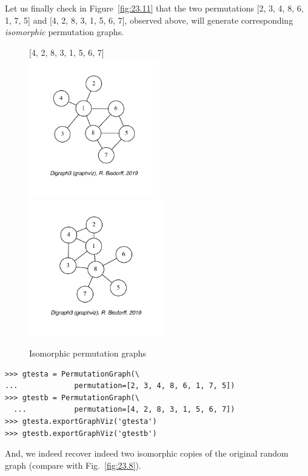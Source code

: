 Let us finally check in Figure~\vref{fig:23.11} that the two permutations [2, 3, 4, 8, 6, 1, 7, 5] and [4, 2, 8, 3, 1, 5, 6, 7], observed above, will generate corresponding \emph{isomorphic} permutation graphs.
\begin{figure}[ht]
  [2, 3, 4, 8, 6, 1, 7, 5]\hfill [4, 2, 8, 3, 1, 5, 6, 7]\\
  \includegraphics[height=6cm]{Figures/23-11-gtesta.pdf}\hfill
  \includegraphics[height=6cm]{Figures/23-11-gtestb.pdf}
\caption{Isomorphic permutation graphs} 
\label{fig:23.11}       %
\end{figure}
\begin{lstlisting}  
>>> gtesta = PermutationGraph(\
...             permutation=[2, 3, 4, 8, 6, 1, 7, 5])
>>> gtestb = PermutationGraph(\
  ...           permutation=[4, 2, 8, 3, 1, 5, 6, 7])
>>> gtesta.exportGraphViz('gtesta')
>>> gtestb.exportGraphViz('gtestb')
\end{lstlisting}

And, we indeed recover indeed two isomorphic copies of the original random graph (compare with Fig.~\vref{fig:23.8}).
 
%


